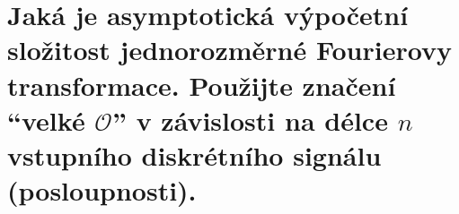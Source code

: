 \section{Jaká je asymptotická výpočetní složitost jednorozměrné Fourierovy transformace. Použijte značení 
\enquote{velké $\mathcal{O}$} v závislosti na délce $n$ vstupního diskrétního signálu (posloupnosti).}